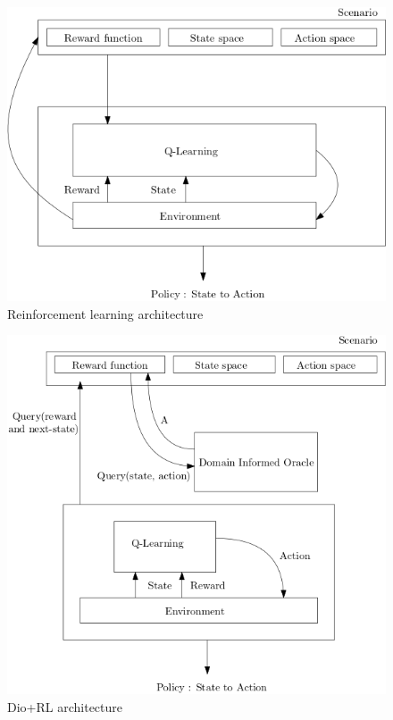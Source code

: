 \documentclass[a4paper,11pt]{article}
\theoremstyle{definition}
\begin{document}
\medskip 

\begin{figure}[H]
  \centering
  \includegraphics[scale=0.41]{basicrl.png}
  \caption{Reinforcement learning architecture}
  \label{fig:basicrl}
\end{figure}


\begin{figure}[H]
  \centering
  \includegraphics[scale=0.42]{dio.png}
  \caption{Dio+RL architecture}
  \label{fig:diorl}
\end{figure}
\end{document}
